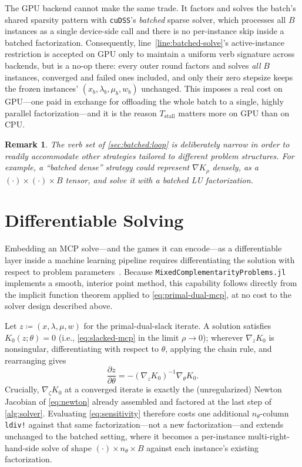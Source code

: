 \documentclass[conference]{IEEEtran}
\newtheorem{remark}{Remark}
\begin{document}
The GPU backend cannot make the same trade. It factors and solves the batch's shared
sparsity pattern with \texttt{cuDSS}'s \emph{batched} sparse solver, which processes all $B$
instances as a single device-side call and there is no per-instance skip inside a batched
factorization. Consequently, line~\ref{line:batched-solve}'s active-instance
restriction is accepted on GPU only to maintain a uniform verb signature across backends, but
is a no-op there: every outer round factors and solves \emph{all} $B$ instances,
converged and failed ones included, and only their zero stepsize keeps the frozen
instances' $(x_b,\lambda_b,\mu_b,w_b)$ unchanged. This imposes a real cost on
GPU---one paid in exchange for offloading the whole batch to a single, highly
parallel factorization---and it is the reason $T_\mathrm{stall}$ matters more on GPU
than on CPU.

\begin{remark}
The verb set of \cref{sec:batched:loop} is deliberately narrow in order to
readily accommodate other strategies tailored to different problem structures.
For example, a ``batched dense'' strategy could represent
$\nabla K_\rho$ densely, as a $(\cdot) \times (\cdot) \times B$ tensor, and solve it with a batched
LU factorization.
\end{remark}

\section{Differentiable Solving}
\label{sec:differentiable}

Embedding an MCP solve---and the games it can encode---as a differentiable layer inside a
machine learning pipeline requires differentiating the solution with respect to problem
parameters~\cite{amos2017optnet}. Because
\texttt{MixedComplementarityProblems.jl} implements a smooth, interior point method, this capability follows directly from the implicit
function theorem applied to \cref{eq:primal-dual-mcp}, at no cost to the solver design
described above.

Let $z \coloneqq (x, \lambda, \mu, w)$ for the primal-dual-slack iterate. A solution
satisfies $K_0(z; \theta) = 0$ (i.e., \cref{eq:slacked-mcp} in the limit $\rho \to 0$); wherever
$\nabla_z K_0$ is nonsingular, differentiating with respect to $\theta$,
applying the chain rule, and rearranging gives
\begin{equation}
  \label{eq:sensitivity}
  \frac{\partial z}{\partial \theta} = -\left(\nabla_z K_0\right)^{-1} \nabla_\theta K_0.
\end{equation}
Crucially, $\nabla_\zeta K_0$ at a converged iterate is exactly the (unregularized) Newton
Jacobian of \cref{eq:newton} already assembled and factored at the last step of
\cref{alg:solver}. Evaluating \cref{eq:sensitivity} therefore costs one additional
$n_\theta$-column \texttt{ldiv!} against that same factorization---not a new factorization---and
extends unchanged to the batched setting, where it becomes a per-instance multi-right-hand-side
solve of shape $(\cdot) \times n_\theta \times B$ against each instance's existing factorization.
\end{document}
